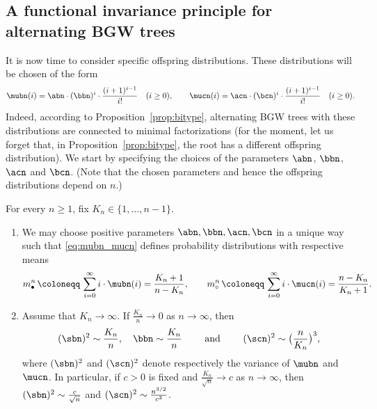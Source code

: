 \subsection{A functional invariance principle for alternating BGW trees}
\label{ss:inv}

It is now time to consider specific offspring distributions.
These distributions will be chosen of the form
\begin{equation}
  \mubn(i)= \abn \cdot  (\bbn)^{i} \cdot \frac{(i+1)^{i-1}}{i!}  \quad (i \geq 0), \qquad \mucn(i)= \acn \cdot  (\bcn)^{i} \cdot \frac{(i+1)^{i-1}}{i!}  \quad (i \geq 0).
  \label{eq:mubn_mucn}
\end{equation}
Indeed, according to Proposition~\ref{prop:bitype},
alternating BGW trees with these distributions are connected to minimal factorizations
(for the moment, let us forget that, in Proposition~\ref{prop:bitype}, the root has a different offspring distribution).
We start by specifying the choices of the parameters
$\abn$, $\bbn$, $\acn$ and $\bcn$.
(Note that the chosen parameters and hence the offspring distributions depend on $n$.)

\begin{lemma}\label{lem:exist} For every $n \ge 1$,  fix $K_{n} \in \{1,\dots,n-1\}$.
\begin{enumerate}
  \item[(i)] We may choose positive parameters  $\abn,\bbn,\acn,\bcn$ in a unique way  such that \eqref{eq:mubn_mucn}
defines probability distributions with respective means
\[m^{n}_{\bullet}  \, \coloneqq  \, \sum_{i=0}^{\infty} i \cdot \mubn(i)= \frac{K_{n}+1}{n-K_{n}}, \qquad m^{n}_{\circ} \, \coloneqq \, \sum_{i=0}^{\infty} i \cdot \mucn(i)= \frac{n-K_{n}}{K_{n}+1}.\]
\item[(ii)] Assume that $K_{n} \rightarrow \infty$. If $\tfrac{K_{n}}{n} \rightarrow 0$ as $n \rightarrow \infty$, then
\[(\sbn)^{2} \sim \frac{K_{n}}{n}, \quad  \bbn \sim \frac{K_{n}}{n}  \qquad \text{ and } \qquad  (\scn)^{2} \sim   \big( \frac{n}{K_{n}} \big)^{3},\]
where $(\sbn)^{2}$ and $(\scn)^{2}$ denote respectively the variance of $\mubn$ and $\mucn$.
In particular, if $c>0$ is fixed and $\tfrac{K_{n}}{\sqrt{n}} \rightarrow c$ as $n \rightarrow \infty$, then   $ (\sbn)^{2} \sim \tfrac{c}{\sqrt{n}}$ and $(\scn)^{2} \sim  \frac{n^{3/2}}{c^{3}}$.
\end{enumerate}
\end{lemma}


